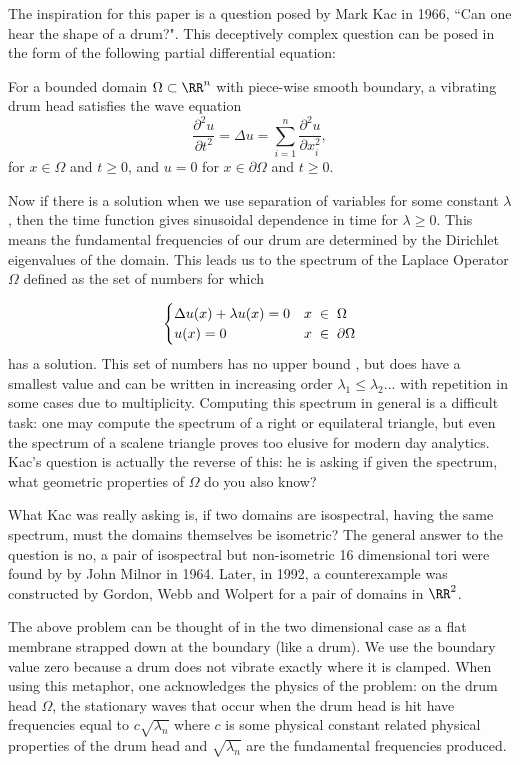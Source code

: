 \documentclass[12pt]{report}
\numberwithin{definition}{section}
\begin{document}
  
	The inspiration for this paper is a question posed by Mark Kac in 1966, ``Can one hear the shape of a drum?". This deceptively complex question can be posed in the form of the following partial differential equation: 
	
	For a bounded domain $\Omega \subset \RR^n $  with piece-wise smooth boundary, a vibrating drum head satisfies the wave equation 
	\[
\frac{\partial^2 u}{\partial t^2} = \Delta u = \sum_{i=1}^n \frac{\partial^2u}{\partial x_i^2},
	\]
	for $x \in \Omega$ and $t \geq 0$, and $u = 0$ for $x \in \partial \Omega$ and  $t \geq 0$.
	
	Now if there is a solution when we use separation of variables for some constant $\lambda$, then the time function gives sinusoidal dependence in time for $\lambda \geq 0$. This means the fundamental frequencies of our drum are determined by the Dirichlet eigenvalues of the domain. This leads us to the spectrum of the Laplace Operator $\Omega$ defined as the set of numbers for which 
 
 \[ \begin{cases} 
      \Delta u(x)+ \lambda u(x) = 0 & x \hspace{1mm}  \in \hspace{1mm} \Omega \\
      u(x) = 0 & x\hspace{1mm}  \in \hspace{1mm} \partial \Omega
   \end{cases}
\]
has a solution. This set of numbers has no upper bound \cite{Grieser}, but does have a smallest value and can be written in increasing order $ {\lambda_1 \leq \lambda_2 ...}$ with repetition in some cases due to multiplicity. Computing this spectrum in general is a difficult task: one may compute the spectrum of a right or equilateral triangle, but even the spectrum of a scalene triangle proves too elusive for modern day analytics. Kac's question is actually the reverse of this: he is asking if given the spectrum, what geometric properties of $\Omega$ do you also know? 

What Kac was really asking is, if two domains are isospectral, having the same spectrum, must the domains themselves be isometric? The general answer to the question is no, a pair of isospectral but non-isometric 16 dimensional tori were found by by John Milnor in 1964. Later, in 1992, a counterexample was constructed by Gordon, Webb and Wolpert for a pair of domains in $\RR^2$. 

	The above problem can be thought of in the two dimensional case as a flat membrane strapped down at the boundary (like a drum). We use the boundary value zero because a drum does not vibrate exactly where it is clamped. When using this metaphor, one acknowledges the physics of the problem: on the drum head $\Omega$, the stationary waves that occur when the drum head is hit have frequencies equal to $c\sqrt{\lambda_n} $ where $c$ is some physical constant related physical properties of the drum head and $\sqrt{\lambda_n} $ are the fundamental frequencies produced. 
\end{document}
